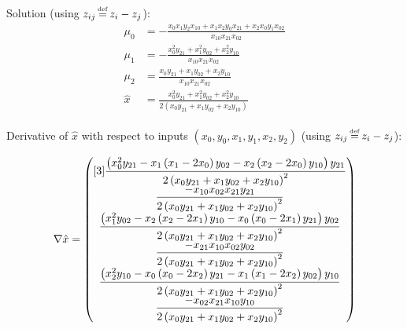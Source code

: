 Solution (using $z_{ij} \operatorname*{\overset{\underset{\mathrm{def}}{}}{=}} z_i - z_j$):
\begin{align}
\mu_0 & =
- \frac{
x_0 x_1 y_2 x_{10}
+
x_1 x_2 y_0 x_{21}
+
x_2 x_0 y_1 x_{02}
}{
x_{10} x_{21} x_{02}
} 
\\
\mu_1 & =
- \frac{
x_0^{2} y_{21}
+ 
x_1^{2} y_{02} 
+
x_2^{2} y_{10}
}{
x_{10} x_{21} x_{02}
} 
\nonumber \\
\mu_2 & = 
\frac{
x_0 y_{21} 
+
x_1 y_{02}
+
x_2 y_{10} 
}{
x_{10} x_{21} x_{02}
 } 
\nonumber  \\ 
 \hat{x} & = 
\frac{
x_0^{2} y_{21} 
 +
x_1^{2} y_{02} 
 +
x_2^{2} y_{10} 
}{
2 \left(
x_0 y_{21} 
+ 
x_1 y_{02} 
+ 
x_2 y_{10}  
\right)
}
\nonumber 
\end{align}


Derivative of $\hat{x}$ with respect to inputs
$(x_0,y_0,x_1,y_1,x_2,y_2)$
(using $z_{ij} \operatorname*{\overset{\underset{\mathrm{def}}{}}{=}} z_i - z_j$):

\begin{equation}
\nabla \hat{x} =
\begin{pmatrix}[3]
\dfrac{
\left(
x_0^2 y_{21}
-
x_1 \left( x_1 - 2 x_0 \right) y_{02}
- 
x_2 \left( x_2 - 2 x_0 \right) y_{10}
\right)
y_{21}
}{ %
2 \left( x_0 y_{21} + x_1 y_{02} + x_2 y_{10} \right)^{2}
} 
\\ %
\dfrac{
- x_{10} x_{02} x_{21} y_{21}
}{
2 \left( x_0 y_{21} + x_1 y_{02} + x_2 y_{10} \right)^{2}
} 
\\  %
\dfrac{
\left(
x_1^2 y_{02}
-
x_2 \left( x_2 - 2 x_1 \right) y_{10}
- 
x_0 \left( x_0 - 2 x_1 \right) y_{21}
\right)
y_{02}
}{ %
2 \left( x_0 y_{21} + x_1 y_{02} + x_2 y_{10} \right)^{2}
}
\\ %
\dfrac{
- x_{21} x_{10} x_{02} y_{02}
}{ %
2 \left( x_0 y_{21} + x_1 y_{02} + x_2 y_{10} \right)^{2}
} 
\\ %
\dfrac{
\left(
x_2^2 y_{10}
-
x_0 \left( x_0 - 2 x_2 \right) y_{21}
- 
x_1 \left( x_1 - 2 x_2 \right) y_{02}
\right)
y_{10}
}{ %
2 \left( x_0 y_{21} + x_1 y_{02} + x_2 y_{10} \right)^{2}
}
\\ %
\dfrac{
- x_{02} x_{21} x_{10} y_{10}
}{ %
2 \left( x_0 y_{21} + x_1 y_{02} + x_2 y_{10} \right)^{2}
}
\end{pmatrix}
\end{equation}

